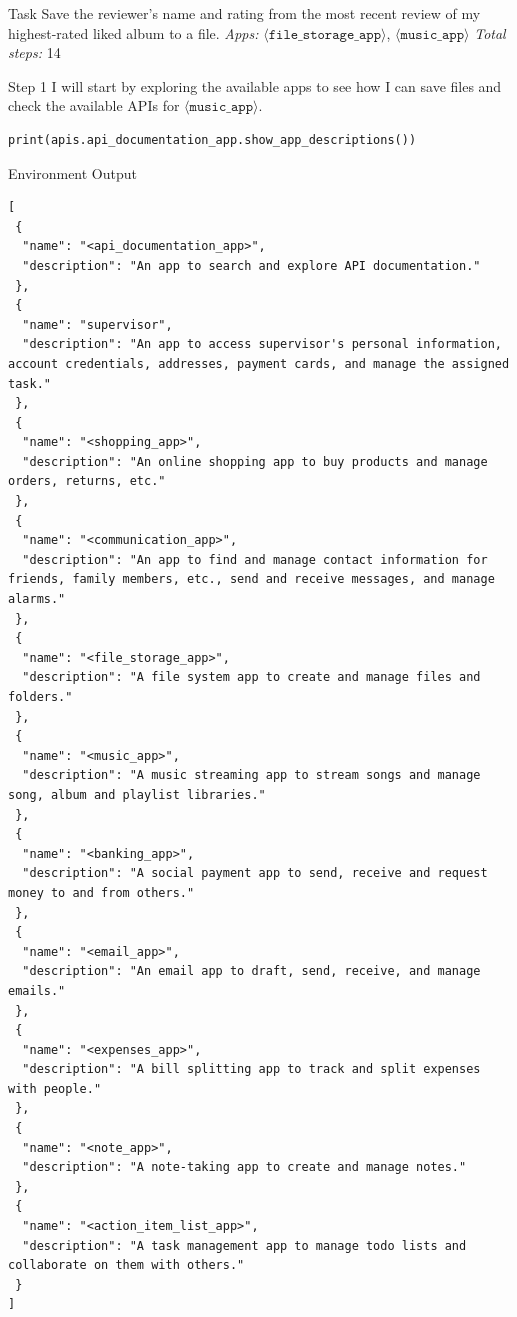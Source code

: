 \begin{center}
\begin{trajbox}{Task}
Save the reviewer's name and rating from the most recent review of my highest-rated liked album to a file.
\tcblower
\textit{Apps:} $\langle\mathtt{file\_storage\_app}\rangle$, \texttt{$\langle\mathtt{music\_app}\rangle$} \quad \textit{Total steps:} 14
\end{trajbox}

\begin{agentbox}{Step 1}
I will start by exploring the available apps to see how I can save files and check the available APIs for $\langle\mathtt{music\_app}\rangle$.
\begin{Verbatim}[fontsize=\scriptsize, breaklines, breakanywhere]
print(apis.api_documentation_app.show_app_descriptions())
\end{Verbatim}
\end{agentbox}
\begin{envbox}{Environment Output}
\begin{Verbatim}[fontsize=\scriptsize, breaklines, breakanywhere]
[
 {
  "name": "<api_documentation_app>",
  "description": "An app to search and explore API documentation."
 },
 {
  "name": "supervisor",
  "description": "An app to access supervisor's personal information, account credentials, addresses, payment cards, and manage the assigned task."
 },
 {
  "name": "<shopping_app>",
  "description": "An online shopping app to buy products and manage orders, returns, etc."
 },
 {
  "name": "<communication_app>",
  "description": "An app to find and manage contact information for friends, family members, etc., send and receive messages, and manage alarms."
 },
 {
  "name": "<file_storage_app>",
  "description": "A file system app to create and manage files and folders."
 },
 {
  "name": "<music_app>",
  "description": "A music streaming app to stream songs and manage song, album and playlist libraries."
 },
 {
  "name": "<banking_app>",
  "description": "A social payment app to send, receive and request money to and from others."
 },
 {
  "name": "<email_app>",
  "description": "An email app to draft, send, receive, and manage emails."
 },
 {
  "name": "<expenses_app>",
  "description": "A bill splitting app to track and split expenses with people."
 },
 {
  "name": "<note_app>",
  "description": "A note-taking app to create and manage notes."
 },
 {
  "name": "<action_item_list_app>",
  "description": "A task management app to manage todo lists and collaborate on them with others."
 }
]


\end{Verbatim}
\end{envbox}
\end{center}

